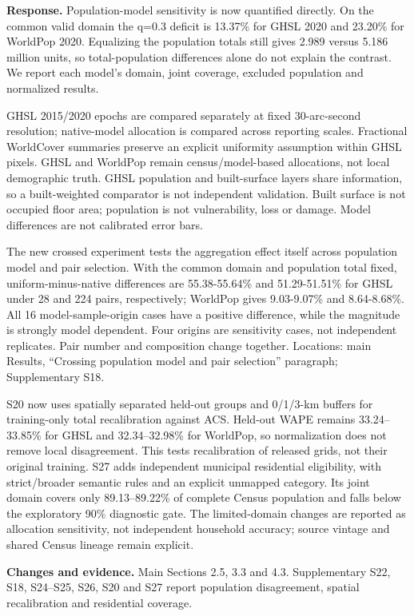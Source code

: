\documentclass[11pt,a4paper]{article}
\begin{document}
\textbf{Response.} Population-model sensitivity is now quantified directly. On the common valid domain the q=0.3 deficit is 13.37\% for GHSL 2020 and 23.20\% for WorldPop 2020. Equalizing the population totals still gives 2.989 versus 5.186 million units, so total-population differences alone do not explain the contrast. We report each model’s domain, joint coverage, excluded population and normalized results.

GHSL 2015/2020 epochs are compared separately at fixed 30-arc-second resolution; native-model allocation is compared across reporting scales. Fractional WorldCover summaries preserve an explicit uniformity assumption within GHSL pixels. GHSL and WorldPop remain census/model-based allocations, not local demographic truth. GHSL population and built-surface layers share information, so a built-weighted comparator is not independent validation. Built surface is not occupied floor area; population is not vulnerability, loss or damage. Model differences are not calibrated error bars.

The new crossed experiment tests the aggregation effect itself across population model and pair selection. With the common domain and population total fixed, uniform-minus-native differences are 55.38-55.64\% and 51.29-51.51\% for GHSL under 28 and 224 pairs, respectively; WorldPop gives 9.03-9.07\% and 8.64-8.68\%. All 16 model-sample-origin cases have a positive difference, while the magnitude is strongly model dependent. Four origins are sensitivity cases, not independent replicates. Pair number and composition change together. Locations: main Results, “Crossing population model and pair selection” paragraph; Supplementary S18.

S20 now uses spatially separated held-out groups and 0/1/3-km buffers for training-only total recalibration against ACS. Held-out WAPE remains 33.24--33.85\% for GHSL and 32.34--32.98\% for WorldPop, so normalization does not remove local disagreement. This tests recalibration of released grids, not their original training. S27 adds independent municipal residential eligibility, with strict/broader semantic rules and an explicit unmapped category. Its joint domain covers only 89.13--89.22\% of complete Census population and falls below the exploratory 90\% diagnostic gate. The limited-domain changes are reported as allocation sensitivity, not independent household accuracy; source vintage and shared Census lineage remain explicit.

\textbf{Changes and evidence.} Main Sections 2.5, 3.3 and 4.3. Supplementary S22, S18, S24--S25, S26, S20 and S27 report population disagreement, spatial recalibration and residential coverage.
\end{document}
